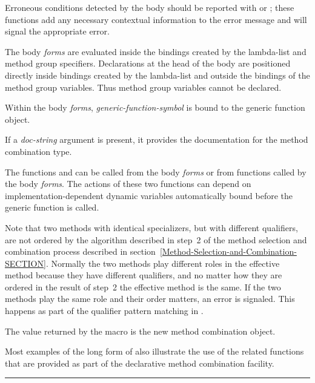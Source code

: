 \begin{defmac}
Erroneous conditions detected by the body should be reported with
 or
; these functions
add any necessary contextual information to the error message and will
signal the appropriate error.

The body {\it forms\/} are evaluated inside the bindings created by the
lambda-list and method group specifiers.  Declarations at the head of
the body are positioned directly inside bindings created by the
lambda-list and outside the bindings of the method group variables. 
Thus method group variables cannot be declared.

Within the body {\it forms\/}, {\it generic-function-symbol}
is bound to the generic function object.

If a {\it doc-string\/} argument is present, it provides the
documentation for the method combination type.

The functions  and 
 can be called from the body {\it forms\/} or
from functions called by the body {\it forms\/}.  The actions of these
two functions can depend on implementation-dependent dynamic variables
automatically bound before the generic function 
 is called.

Note that two methods with identical specializers, but with different
qualifiers, are not ordered by the algorithm described in step~2 of
the method selection and combination process described in
section~\ref{Method-Selection-and-Combination-SECTION}.
Normally the two methods play
different roles in the effective method because they have different
qualifiers, and no matter how they are ordered in the result of step~2
the effective method is the same.  If the two methods play the same
role and their order matters, an error is signaled.  This happens as
part of the qualifier pattern matching in 
.


The value returned by the  macro is the new
method combination object.


Most examples of the long form of  also
illustrate the use of the related functions that are provided as part
of the declarative method combination facility.

\hrule width0pt\relax


\end{defmac}
